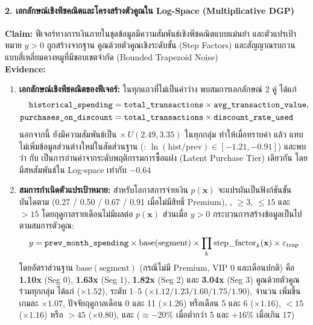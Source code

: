 \paragraph{2. เอกลักษณ์เชิงพีชคณิตและโครงสร้างตัวคูณใน Log-Space (Multiplicative DGP)}
\textbf{Claim:} ฟีเจอร์ทางการเงินภายในชุดข้อมูลมีความสัมพันธ์เชิงพีชคณิตแบบแม่นยำ และตัวแปรเป้าหมาย $y > 0$ ถูกสร้างจากฐาน  คูณด้วยตัวคูณเชิงระดับขั้น (Step Factors) และสัญญาณรบกวนแบบสี่เหลี่ยมคางหมูที่มีขอบเขตจำกัด (Bounded Trapezoid Noise) \\
\textbf{Evidence:}
\begin{enumerate}
    \item \textbf{เอกลักษณ์เชิงพีชคณิตของฟีเจอร์:} ในทุกแถวที่ไม่เป็นค่าว่าง พบสมการเอกลักษณ์ 2 คู่ ได้แก่
    \begin{align*}
    \text{\texttt{historical\_spending}} &= \text{\texttt{total\_transactions}} \times \text{\texttt{avg\_transaction\_value}}, \\
    \text{\texttt{purchases\_on\_discount}} &= \text{\texttt{total\_transactions}} \times \text{\texttt{discount\_rate\_used}}
    \end{align*}
    นอกจากนี้  ยังมีความสัมพันธ์เป็น  $\times\, U(2.49, 3.35)$ ในทุกกลุ่ม ทำให้เมื่อทราบค่า  แล้ว  แทบไม่เพิ่มข้อมูลส่วนต่างใหม่ในสัดส่วนฐาน (: $\ln(\text{hist}/\text{prev}) \in [-1.21, -0.91]$) และพบว่า  กับ  เป็นการอ่านค่าจากระดับพฤติกรรมการซื้อแฝง (Latent Purchase Tier) เดียวกัน โดยมีสหสัมพันธ์ใน Log-space เท่ากับ $-0.64$
    \item \textbf{สมการกำเนิดตัวแปรเป้าหมาย:} สำหรับโอกาสการจ่ายเงิน $p(\mathbf{x})$ จะแปรผันเป็นฟังก์ชันขั้นบันไดตาม  (0.27 / 0.50 / 0.67 / 0.91 เมื่อไม่มีสิทธิ์ Premium), ,  $\ge 3$,  $\le 15$ และ  $> 15$ โดยฤดูกาลรายเดือนไม่มีผลต่อ $p(\mathbf{x})$ ส่วนเมื่อ $y > 0$ กระบวนการสร้างข้อมูลเป็นไปตามสมการตัวคูณ:
    \begin{equation}
    \label{eq:t3_dgp}
    y = \text{\texttt{prev\_month\_spending}} \times \text{base}(\text{segment}) \times \prod_k \text{step\_factor}_k(\mathbf{x}) \times \varepsilon_{\text{trap}}
    \end{equation}
    โดยอัตราส่วนฐาน $\text{base}(\text{segment})$ (กรณีไม่มี Premium, VIP 0 และเดือนปกติ) คือ \textbf{1.10x} (Seg 0), \textbf{1.63x} (Seg 1), \textbf{1.82x} (Seg 2) และ \textbf{3.04x} (Seg 3) คูณด้วยตัวคูณร่วมทุกกลุ่ม ได้แก่  ($\times 1.52$),  ระดับ 1--5 ($\times 1.12 / 1.23 / 1.60 / 1.75 / 1.90$), จำนวน  เพิ่มขึ้นเกมละ $\times 1.07$, ปัจจัยฤดูกาลเดือน 0 และ 11 ($\times 1.26$) หรือเดือน 5 และ 6 ($\times 1.16$),  $< 15$ ($\times 1.16$) หรือ $> 45$ ($\times 0.80$), และ  ($\approx -20\%$ เมื่อต่ำกว่า 5 และ $+16\%$ เมื่อเกิน 17)

\end{enumerate}
